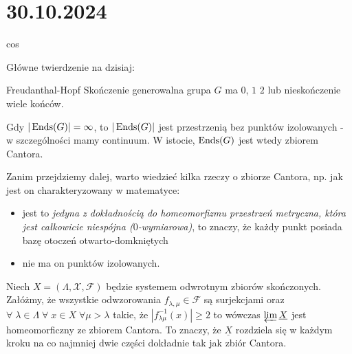 \section{30.10.2024}{cos}



Główne twierdzenie na dzisiaj:
\begin{theorem}{Freudanthal-Hopf}{}
  Skończenie generowalna grupa $G$ ma $0$, $1$ $2$ lub nieskończenie wiele końców.

  Gdy $|\operatorname{Ends}(G)|=\infty$, to $|\operatorname{Ends}(G)|$ jest przestrzenią bez punktów izolowanych - w szczególności mamy continuum. W istocie, $\operatorname{Ends}(G)$ jest wtedy zbiorem Cantora.
\end{theorem}

Zanim przejdziemy dalej, warto wiedzieć kilka rzeczy o zbiorze Cantora, np. jak jest on charakteryzowany w matematyce:
\begin{itemize}
  \item[\pumpkin] jest to {\slshape jedyna z dokładnością do homeomorfizmu przestrzeń metryczna, która jest całkowicie niespójna ($0$-wymiarowa)}, to znaczy, że każdy punkt posiada bazę otoczeń otwarto-domkniętych 
  \item[\skull] nie ma on punktów izolowanych.
\end{itemize}

Niech $X=(\Lambda, \mathcal{X}, \mathcal{F})$ będzie systemem odwrotnym zbiorów skończonych. Załóżmy, że wszystkie odwzorowania $f_{\lambda,\mu}\in\mathcal{F}$ są surjekcjami oraz $\forall\;\lambda\in\Lambda\;\forall\;x\in X\;\forall\mu>\lambda$ takie, że $|f^{-1}_{\lambda\mu}(x)|\geq 2$ to wówczas $\varprojlim \underline{X}$ jest homeomorficzny ze zbiorem Cantora. To znaczy, że $\underline{X}$ rozdziela się w każdym kroku na co najmniej dwie części dokładnie tak jak zbiór Cantora.

